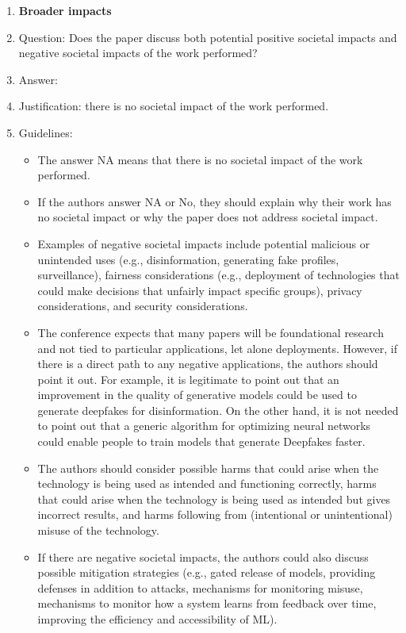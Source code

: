 \documentclass{article}
\theoremstyle{plain}
\theoremstyle{definition}
\theoremstyle{remark}
\begin{document}
\begin{enumerate}
\item {\bf Broader impacts}
    \item[] Question: Does the paper discuss both potential positive societal impacts and negative societal impacts of the work performed?
    \item[] Answer: \answerNA{} %
    \item[] Justification: there is no societal impact of the work performed.
    \item[] Guidelines:
    \begin{itemize}
        \item The answer NA means that there is no societal impact of the work performed.
        \item If the authors answer NA or No, they should explain why their work has no societal impact or why the paper does not address societal impact.
        \item Examples of negative societal impacts include potential malicious or unintended uses (e.g., disinformation, generating fake profiles, surveillance), fairness considerations (e.g., deployment of technologies that could make decisions that unfairly impact specific groups), privacy considerations, and security considerations.
        \item The conference expects that many papers will be foundational research and not tied to particular applications, let alone deployments. However, if there is a direct path to any negative applications, the authors should point it out. For example, it is legitimate to point out that an improvement in the quality of generative models could be used to generate deepfakes for disinformation. On the other hand, it is not needed to point out that a generic algorithm for optimizing neural networks could enable people to train models that generate Deepfakes faster.
        \item The authors should consider possible harms that could arise when the technology is being used as intended and functioning correctly, harms that could arise when the technology is being used as intended but gives incorrect results, and harms following from (intentional or unintentional) misuse of the technology.
        \item If there are negative societal impacts, the authors could also discuss possible mitigation strategies (e.g., gated release of models, providing defenses in addition to attacks, mechanisms for monitoring misuse, mechanisms to monitor how a system learns from feedback over time, improving the efficiency and accessibility of ML).
    \end{itemize}
    

\end{enumerate}
\end{document}
